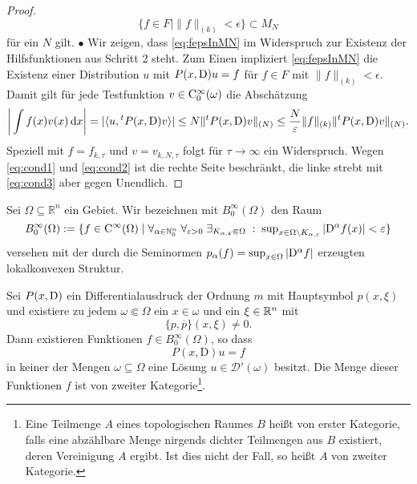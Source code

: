 \begin{proof}
\begin{equation}\label{eq:fepsInMN}
    \{ f\in F\mid \|f\|_{(k)}<\epsilon\} \subset M_N
\end{equation}
für ein $N$ gilt. $\bullet$  Wir zeigen, dass \eqref{eq:fepsInMN} im Widerspruch zur Existenz der Hilfsfunktionen aus Schritt 2 steht. 
Zum Einen impliziert \eqref{eq:fepsInMN} die Existenz einer Distribution $u$ mit $P(x,\mathrm D)u=f$ für $f\in F$ mit $\|f\|_{(k)}<\epsilon$. Damit gilt für jede Testfunktion $v\in\mathrm C_0^\infty(\omega)$ die Abschätzung
\begin{equation}
   \bigg| \int f(x) v(x) \,\mathrm d x\bigg| = |\langle u, {}^t P(x,\mathrm D) v \rangle| \le N \| {}^t P(x,\mathrm D) v\|_{(N)} \le \frac N{\varepsilon} \|f\|_{(k)} \|{}^tP(x,\mathrm D) v\|_{(N)}.
\end{equation}
Speziell mit $f=f_{k,\tau}$ und $v=v_{k,N,\tau}$ folgt für $\tau\to\infty$ ein Widerspruch. Wegen \eqref{eq:cond1} und \eqref{eq:cond2} ist die rechte Seite beschränkt, die linke strebt mit \eqref{eq:cond3} aber gegen Unendlich.
\end{proof}

\begin{df}
Sei $\Omega\subseteq\mathbb{R}^n$ ein Gebiet. Wir bezeichnen mit $B_0^\infty(\Omega)$ den Raum 
\begin{equation}
B_0^\infty(\Omega) :=\{f\in \mathrm C^\infty(\Omega) \mid \forall_{\alpha\in\mathbb N_0^n}\;\forall_{\varepsilon >0} \;\exists_{K_{\alpha,\varepsilon}\Subset\Omega} \;:\; \sup\nolimits_{x\in \Omega\setminus K_{\alpha,\varepsilon}}|\mathrm D^\alpha f(x)|<\varepsilon \}
\end{equation}
versehen mit der durch die Seminormen $p_\alpha(f)=\sup_{x\in\Omega} |\mathrm D^\alpha f|$ erzeugten lokalkonvexen Struktur.
\end{df}



\begin{thm}\label{thm:2_hoer}
Sei $P(x,\mathrm D)$ ein Differentialausdruck der Ordnung $m$ mit  Hauptsymbol $p(x,\xi)$ und existiere zu jedem $\omega\Subset\Omega$ 
ein $x\in\omega$ und ein $\xi\in\mathbb R^n$ mit
\begin{equation}
 \{p,\overline p\}(x,\xi)\ne 0.
\end{equation}
Dann existieren Funktionen $f\in B_0^\infty(\Omega)$, so dass
\begin{equation}\label{lewy:pxDu=f}
P(x,\mathrm D)u=f
\end{equation}
in keiner der Mengen $\omega\subseteq\Omega$ eine Lösung $u\in\mathscr D'(\omega)$ besitzt. Die Menge dieser Funktionen $f$ ist von zweiter Kategorie\footnote{Eine Teilmenge $A$ eines topologischen Raumes $B$ heißt von erster Kategorie, falls eine abzählbare Menge nirgends dichter Teilmengen aus $B$ existiert, deren Vereinigung $A$ ergibt. Ist dies nicht der Fall, so heißt $A$ von zweiter Kategorie.}.
\end{thm}

